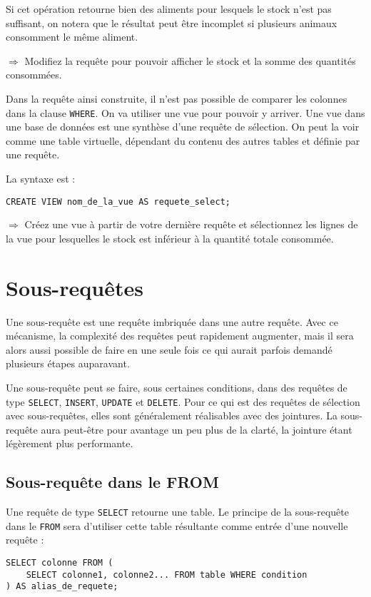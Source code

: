 \documentclass[11pt]{article}
\begin{document}
			Si cet opération retourne bien des aliments pour lesquels le stock n'est pas suffisant, on notera que le résultat peut être incomplet si plusieurs animaux consomment le même aliment.
			
			$\Rightarrow$ Modifiez la requête pour pouvoir afficher le stock et la somme des quantités consommées.
			
			Dans la requête ainsi construite, il n'est pas possible de comparer les colonnes dans la clause \lstinline{WHERE}. On va utiliser une vue pour pouvoir y arriver. Une vue dans une base de données est une synthèse d'une requête de sélection. On peut la voir comme une table virtuelle, dépendant du contenu des autres tables et définie par une requête.
			
			La syntaxe est :
			\begin{lstlisting}
CREATE VIEW nom_de_la_vue AS requete_select;
			\end{lstlisting}
			
			$\Rightarrow$ Créez une vue à partir de votre dernière requête et sélectionnez les lignes de la vue pour lesquelles le stock est inférieur à la quantité totale consommée.
			
			
		\section{Sous-requêtes}
			Une sous-requête est une requête imbriquée dans une autre requête. Avec ce mécanisme, la complexité des requêtes peut rapidement augmenter, mais il sera alors aussi possible de faire en une seule fois ce qui aurait parfois demandé plusieurs étapes auparavant. 
			
			Une sous-requête peut se faire, sous certaines conditions, dans des requêtes de type \lstinline{SELECT}, \lstinline{INSERT}, \lstinline{UPDATE} et \lstinline{DELETE}. Pour ce qui est des requêtes de sélection avec sous-requêtes, elles sont généralement réalisables avec des jointures. La sous-requête aura peut-être pour avantage un peu plus de la clarté, la jointure étant légèrement plus performante.
			
			\subsection{Sous-requête dans le FROM}
				Une requête de type \lstinline{SELECT} retourne une table. Le principe de la sous-requête dans le \lstinline{FROM} sera d'utiliser cette table résultante comme entrée d'une nouvelle requête :
				\begin{lstlisting}
SELECT colonne FROM (
	SELECT colonne1, colonne2... FROM table WHERE condition
) AS alias_de_requete;
				\end{lstlisting}
				
\end{document}
